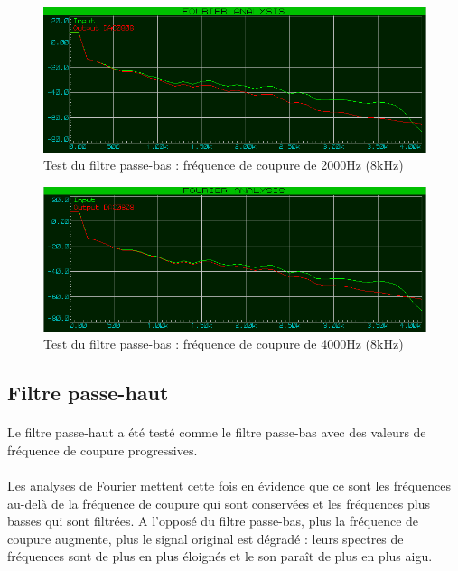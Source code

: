 \documentclass{article}
\begin{document}
    \begin{figure}[H]
        \centering
        \includegraphics[width=.75\textwidth]{./images/spectrum_low_pass_2000_8k.png}
        \caption{Test du filtre passe-bas : fréquence de coupure de 2000Hz (8kHz)}
    \end{figure}
    \begin{figure}[H]
        \centering
        \includegraphics[width=.75\textwidth]{./images/spectrum_low_pass_4000_8k.png}
        \caption{Test du filtre passe-bas : fréquence de coupure de 4000Hz (8kHz)}
    \end{figure}


    \subsection{Filtre passe-haut}
    \paragraph{}
    Le filtre passe-haut a été testé comme le filtre passe-bas avec des valeurs de fréquence de coupure progressives.

    \paragraph{}
    Les analyses de Fourier mettent cette fois en évidence que ce sont les fréquences au-delà de la fréquence de coupure qui sont conservées et les fréquences plus basses qui sont filtrées. A l'opposé du filtre passe-bas, plus la fréquence de coupure augmente, plus le signal original est dégradé : leurs spectres de fréquences sont de plus en plus éloignés et le son paraît de plus en plus aigu.
\end{document}
